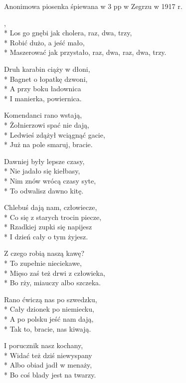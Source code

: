 \begin{info}Anonimowa piosenka śpiewana w 3 pp w Zegrzu w 1917 r.\end{info}

\begin{lyrics}[longestline={Maszerować jak przystało, raz, dwa, raz, dwa, trzy.}]

,\\*
Los go gnębi jak cholera, raz, dwa, trzy,\\*
Robić dużo, a jeść mało,\\*
Maszerować jak przystało, raz, dwa, raz, dwa, trzy.

Druh karabin ciąży w dłoni,\\*
Bagnet o łopatkę dzwoni,\\*
A przy boku ładownica\\*
I manierka, powiernica.

Komendanci rano wstają,\\*
Żołnierzowi spać nie dają,\\*
Ledwieś zdążył wciągnąć gacie,\\*
Już na pole smaruj, bracie.

Dawniej były lepsze czasy,\\*
Nie jadało się kiełbasy,\\*
Nim znów wrócą czasy syte,\\*
To odwalisz dawno kitę.

Chlebuś dają nam, człowiecze,\\*
Co się z starych trocin piecze,\\*
Rzadkiej zupki się napijesz\\*
I dzień cały o tym żyjesz.

Z czego robią naszą kawę?\\*
To zupełnie nieciekawe,\\*
Mięso zaś też drwi z człowieka,\\*
Bo rży, miauczy albo szczeka.

Rano ćwiczą nas po szwedzku,\\*
Cały dzionek po niemiecku,\\*
A po polsku jeść nam dają,\\*
Tak to, bracie, nas kiwają.

I porucznik nasz kochany,\\*
Widać też dziś niewyspany\\*
Albo obiad jadł w menaży,\\*
Bo coś blady jest na twarzy.
\end{lyrics}



